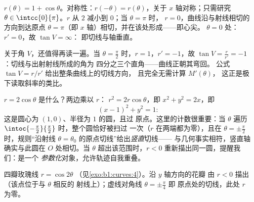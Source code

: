 \begin{example}[心形线]\label{ex:b1:curves:cardioid}
$r(\theta) = 1 + \cos\theta$。对称性：$r(-\theta)
= r(\theta)$，关于 $x$ 轴对称；只需研究 $\theta \in
\intcc{0}{\pi}$。$r$ 从 $2$ 减小到 $0$；当 $\theta = \pi$ 时，
$r = 0$，曲线沿与射线相切的方向到达原点
$\theta = \pi$（即 $x$ 轴）相切，并在该处形成——即心尖。
$\theta = 0$ 处：$r' = 0$，故 $\tan V = \infty$：
即切线与轴垂直。

关于角 $V$，还值得再读一遍。当 $\theta =
\frac\pi2$ 时，$r = 1$，$r' = -1$，故 $\tan V = \frac{r}{r'} =
-1$：切线与出射射线所成的角为
四分之三个直角——曲线正朝其弯回。
公式 $\tan V = r/r'$ 给出整条曲线上的切线方向，
且完全无需计算 $M'(\theta)$，
这正是极下读取斜率的类比。
\end{example}

\begin{example}
\label{ex:b1:curves:polarcircle}
 $r = 2\cos\theta$ 是什么？两边乘以 $r$：
$r^2 = 2r\cos\theta$，即 $x^2 + y^2 = 2x$，即
\[
(x - 1)^2 + y^2 = 1 :
\]
这是圆心为 $(1, 0)$、半径为 $1$ 的圆，且过
原点。这里的计数很重要：当 $\theta$ 遍历
$\intoc{-\frac\pi2}{\frac\pi2}$ 时，整个圆恰好被扫过
一次（$r$ 在两端都为零），且在 $\theta =
\pm\frac\pi2$ 时，规则“沿射线
$\theta = \theta_0$ 的原点切线”给出\emph{竖直}切线——
与几何事实相符，竖直轴确实与此圆在
$O$ 处相切。当 $\theta$ 超出该范围时，$r < 0$
重新描出同一圆，提醒我们：是一个
\emph{参数化}对象，允许轨迹自我重叠。
\end{example}

\begin{omfigure}

{\small 四瓣玫瑰线 $r = \cos 2\theta$
（见\cref{exo:b1:curves:4}）。沿 $y$ 轴方向的花瓣
由 $r < 0$ 描出（该点位于与 $\theta$ 相反的
射线上）；虚线对角线 $\theta = \pm\frac\pi4$ 即
原点处的切线，此处 $r$ 为零。}
\end{omfigure}

